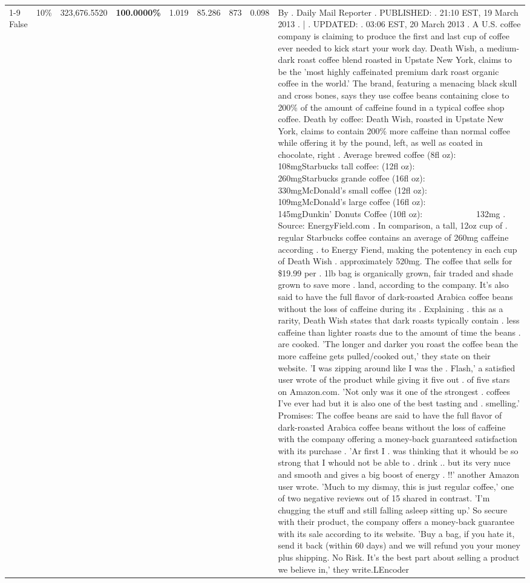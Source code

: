 \begin{table}[H]
{\begin{tabular}{lllrlllll}
\cline{1-9} \cline{2-9}
False & 10\% & 323,676.5520 & \bfseries \color{red} 100.0000\% & 1.019 & 85.286 & 873 & 0.098 & By . Daily Mail Reporter . PUBLISHED: . 21:10 EST, 19 March 2013 . | . UPDATED: . 03:06 EST, 20 March 2013 . A U.S. coffee company is claiming to produce the first and last cup of coffee ever needed to kick start your work day. Death Wish, a medium-dark roast coffee blend roasted in Upstate New York, claims to be the 'most highly caffeinated premium dark roast organic coffee in the world.' The brand, featuring a menacing black skull and cross bones, says they use coffee beans containing close to 200\% of the amount of caffeine found in a typical coffee shop coffee. Death by coffee: Death Wish, roasted in Upstate New York, claims to contain 200\% more caffeine than normal coffee while offering it by the pound, left, as well as coated in chocolate, right . Average brewed coffee (8fl oz):              108mgStarbucks tall coffee: (12fl oz):                260mgStarbucks grande coffee (16fl oz):         330mgMcDonald's small coffee (12fl oz):           109mgMcDonald's large coffee (16fl oz):           145mgDunkin' Donuts Coffee (10fl oz):             132mg . Source: EnergyField.com . In comparison, a tall, 12oz cup of . regular Starbucks coffee contains an average of 260mg caffeine according . to Energy Fiend, making the potentency in each cup of Death Wish . approximately 520mg. The coffee that sells for \$19.99 per . 1lb bag is organically grown, fair traded and shade grown to save more . land, according to the company. It's also said to have the full flavor of dark-roasted Arabica coffee beans without the loss of caffeine during its . Explaining . this as a rarity, Death Wish states that dark roasts typically contain . less caffeine than lighter roasts due to the amount of time the beans . are cooked. 'The longer and darker you roast the coffee bean the more caffeine gets pulled/cooked out,' they state on their website. 'I was zipping around like I was the . Flash,' a satisfied user wrote of the product while giving it five out . of five stars on Amazon.com. 'Not only was it one of the strongest . coffees I've ever had but it is also one of the best tasting and . smelling.’ Promises: The coffee beans are said to have the full flavor of dark-roasted Arabica coffee beans without the loss of caffeine with the company offering a money-back guaranteed satisfaction with its purchase . 'Ar first I . was thinking that it whould be so strong that I whould not be able to . drink .. but its very nuce and smooth and gives a big boost of energy . !!' another Amazon user wrote. 'Much to my dismay, this is just regular coffee,' one of two negative reviews out of 15 shared in contrast. 'I'm chugging the stuff and still falling asleep sitting up.' So secure with their product, the company offers a money-back guarantee with its sale according to its website. 'Buy a bag, if you hate it, send it back (within 60 days) and we will refund you your money plus shipping. No Risk. It’s the best part about selling a product we believe in,' they write.LEncoder \\

\end{tabular}}
\end{table}
